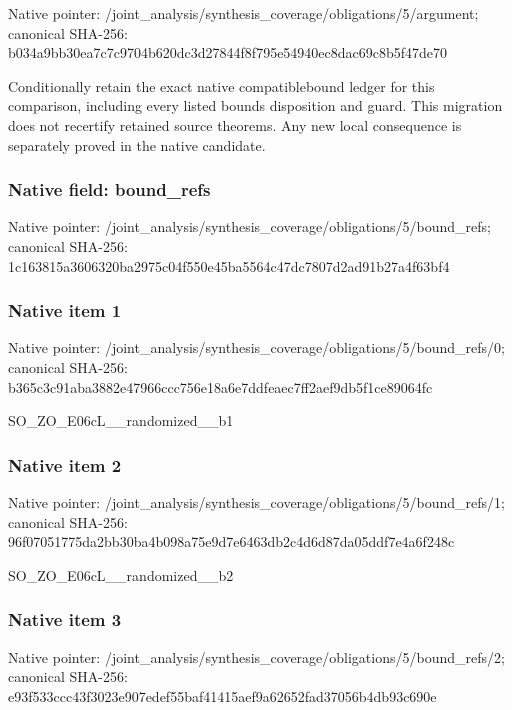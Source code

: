 \documentclass[10pt,a4paper]{article}
\begin{document}
Native pointer: /joint\_analysis/synthesi\allowbreak{}s\_coverage/obligations/5\allowbreak{}/argument; canonical SHA-256: b034a9bb30ea7c7c9704b620\allowbreak{}dc3d27844f8f795e54940ec8\allowbreak{}dac69c8b5f47de70


Conditionally retain the exact native compatiblebound ledger for this comparison, including every listed bounds disposition and guard. This migration does not recertify retained source theorems. Any new local consequence is separately proved in the native candidate.


\subsubsection{Native field: bound\_refs}


Native pointer: /joint\_analysis/synthesi\allowbreak{}s\_coverage/obligations/5\allowbreak{}/bound\_refs; canonical SHA-256: 1c163815a3606320ba2975c0\allowbreak{}4f550e45ba5564c47dc7807d\allowbreak{}2ad91b27a4f63bf4



\subsubsection{Native item 1}


Native pointer: /joint\_analysis/synthesi\allowbreak{}s\_coverage/obligations/5\allowbreak{}/bound\_refs/0; canonical SHA-256: b365c3c91aba3882e47966cc\allowbreak{}c756e18a6e7ddfeaec7ff2ae\allowbreak{}f9db5f1ce89064fc


SO\_ZO\_E06cL\_\_randomized\_\_b1


\subsubsection{Native item 2}


Native pointer: /joint\_analysis/synthesi\allowbreak{}s\_coverage/obligations/5\allowbreak{}/bound\_refs/1; canonical SHA-256: 96f07051775da2bb30ba4b09\allowbreak{}8a75e9d7e6463db2c4d6d87d\allowbreak{}a05ddf7e4a6f248c


SO\_ZO\_E06cL\_\_randomized\_\_b2


\subsubsection{Native item 3}


Native pointer: /joint\_analysis/synthesi\allowbreak{}s\_coverage/obligations/5\allowbreak{}/bound\_refs/2; canonical SHA-256: e93f533ccc43f3023e907ede\allowbreak{}f55baf41415aef9a62652fad\allowbreak{}37056b4db93c690e
\end{document}
